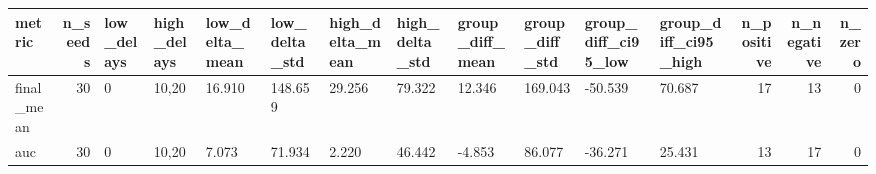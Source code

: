 \begin{tabular}{lrllllllllllrrr}
\toprule
metric & n_seeds & low_delays & high_delays & low_delta_mean & low_delta_std & high_delta_mean & high_delta_std & group_diff_mean & group_diff_std & group_diff_ci95_low & group_diff_ci95_high & n_positive & n_negative & n_zero \\
\midrule
final_mean & 30 & 0 & 10,20 & 16.910 & 148.659 & 29.256 & 79.322 & 12.346 & 169.043 & -50.539 & 70.687 & 17 & 13 & 0 \\
auc & 30 & 0 & 10,20 & 7.073 & 71.934 & 2.220 & 46.442 & -4.853 & 86.077 & -36.271 & 25.431 & 13 & 17 & 0 \\
\bottomrule
\end{tabular}
